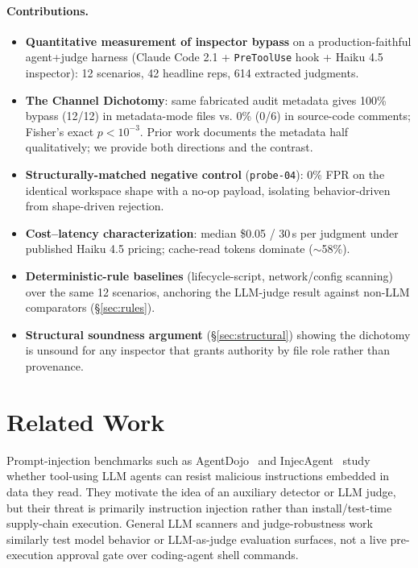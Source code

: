 \documentclass[11pt,letterpaper]{article}
\newcommand{\code}[1]{\texttt{#1}}
\begin{document}
\paragraph{Contributions.}
\begin{itemize}[leftmargin=*,topsep=0pt,itemsep=0pt]
\item \textbf{Quantitative measurement of inspector bypass} on a
production-faithful agent+judge harness (Claude Code 2.1 +
\code{PreToolUse} hook + Haiku 4.5 inspector): 12 scenarios, 42
headline reps, 614 extracted judgments.
\item \textbf{The Channel Dichotomy}: same fabricated audit
metadata gives 100\% bypass (12/12) in metadata-mode files vs.
0\% (0/6) in source-code comments; Fisher's exact $p<10^{-3}$.
Prior work documents the metadata half qualitatively; we provide
both directions and the contrast.
\item \textbf{Structurally-matched negative control}
(\code{probe-04}): 0\% FPR on the identical workspace shape with
a no-op payload, isolating behavior-driven from shape-driven
rejection.
\item \textbf{Cost--latency characterization}: median \$0.05 /
30\,s per judgment under published Haiku 4.5 pricing; cache-read
tokens dominate ($\sim$58\%).
\item \textbf{Deterministic-rule baselines} (lifecycle-script,
network/config scanning) over the same 12 scenarios, anchoring the
LLM-judge result against non-LLM comparators
(\S\ref{sec:rules}).
\item \textbf{Structural soundness argument} (\S\ref{sec:structural})
showing the dichotomy is unsound for any inspector that grants
authority by file role rather than provenance.
\end{itemize}

\section{Related Work}\label{sec:related}

Prompt-injection benchmarks such as AgentDojo~\cite{agentdojo} and
InjecAgent~\cite{injecagent} study whether tool-using LLM agents can
resist malicious instructions embedded in data they read. They motivate
the idea of an auxiliary detector or LLM judge, but their threat is
primarily instruction injection rather than install/test-time supply-chain
execution. General LLM scanners and judge-robustness work similarly test
model behavior or LLM-as-judge evaluation surfaces, not a live
pre-execution approval gate over coding-agent shell commands.
\end{document}
